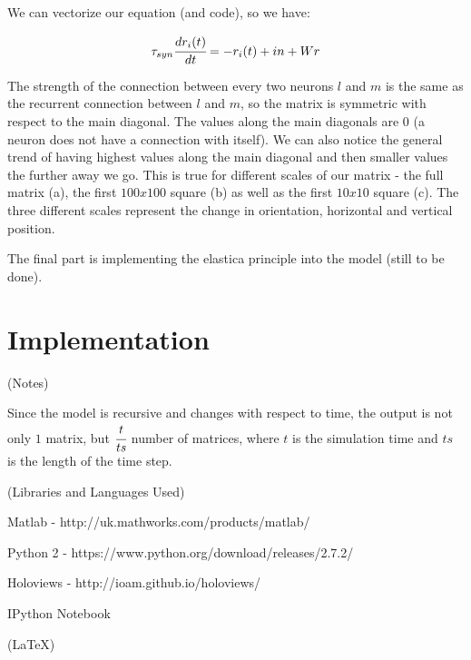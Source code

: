 We can vectorize our equation (and code), so we have:

\begin{equation}
\tau_{syn}\cfrac{dr_{i}(t)}{dt}=-r_{i}(t)+in+Wr
\end{equation}

The strength of the connection between every two neurons $l$ and $m$ is the same as the recurrent connection between $l$ and $m$, so the matrix is symmetric with respect to the main diagonal. The values along the main diagonals are $0$ (a neuron does not have a connection with itself). We can also notice the general trend of having highest values along the main diagonal and then smaller values the further away we go. This is true for different scales of our matrix - the full matrix (a), the first $100x100$ square (b) as well as the first $10x10$ square (c). The three different scales represent the change in orientation, horizontal and vertical position.




The final part is implementing the elastica principle into the model (still to be done).





\chapter{Implementation}

(Notes)

Since the model is recursive and changes with respect to time, the output is not only $1$ matrix, but $\cfrac{t}{ts}$ number of matrices, where $t$ is the simulation time and $ts$ is the length of the time step.

(Libraries and Languages Used)

Matlab - http://uk.mathworks.com/products/matlab/

Python 2 - https://www.python.org/download/releases/2.7.2/

Holoviews - http://ioam.github.io/holoviews/

IPython Notebook

(LaTeX)

